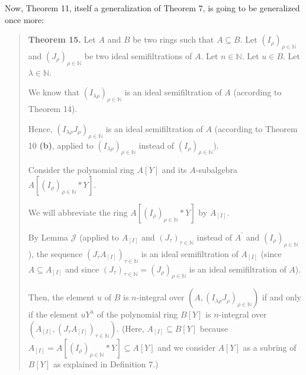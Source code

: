 \documentclass[12pt,final,notitlepage,onecolumn]{article}%
\begin{document}
Now, Theorem 11, itself a generalization of Theorem 7, is going to be
generalized once more:

\begin{quote}
\textbf{Theorem 15.} Let $A$ and $B$ be two rings such that $A\subseteq B$.
Let $\left(  I_{\rho}\right)  _{\rho\in\mathbb{N}}$ and $\left(  J_{\rho
}\right)  _{\rho\in\mathbb{N}}$ be two ideal semifiltrations of $A$. Let
$n\in\mathbb{N}$. Let $u\in B$. Let $\lambda\in\mathbb{N}$.

We know that $\left(  I_{\lambda\rho}\right)  _{\rho\in\mathbb{N}}$ is an
ideal semifiltration of $A$ (according to Theorem 14).

Hence, $\left(  I_{\lambda\rho}J_{\rho}\right)  _{\rho\in\mathbb{N}}$ is an
ideal semifiltration of $A$ (according to Theorem 10 \textbf{(b)}, applied to
$\left(  I_{\lambda\rho}\right)  _{\rho\in\mathbb{N}}$ instead of $\left(
I_{\rho}\right)  _{\rho\in\mathbb{N}}$).

Consider the polynomial ring $A\left[  Y\right]  $ and its $A$-subalgebra
$A\left[  \left(  I_{\rho}\right)  _{\rho\in\mathbb{N}}\ast Y\right]  $.

We will abbreviate the ring $A\left[  \left(  I_{\rho}\right)  _{\rho
\in\mathbb{N}}\ast Y\right]  $ by $A_{\left[  I\right]  }$.

By Lemma $\mathcal{J}$ (applied to $A_{\left[  I\right]  }$ and $\left(
J_{\tau}\right)  _{\tau\in\mathbb{N}}$ instead of $A^{\prime}$ and $\left(
I_{\rho}\right)  _{\rho\in\mathbb{N}}$), the sequence $\left(  J_{\tau
}A_{\left[  I\right]  }\right)  _{\tau\in\mathbb{N}}$ is an ideal
semifiltration of $A_{\left[  I\right]  }$ (since $A\subseteq A_{\left[
I\right]  }$ and since $\left(  J_{\tau}\right)  _{\tau\in\mathbb{N}}=\left(
J_{\rho}\right)  _{\rho\in\mathbb{N}}$ is an ideal semifiltration of $A$).

Then, the element $u$ of $B$ is $n$-integral over $\left(  A,\left(
I_{\lambda\rho}J_{\rho}\right)  _{\rho\in\mathbb{N}}\right)  $ if and only if
the element $uY^{\lambda}$ of the polynomial ring $B\left[  Y\right]  $ is
$n$-integral over $\left(  A_{\left[  I\right]  },\left(  J_{\tau}A_{\left[
I\right]  }\right)  _{\tau\in\mathbb{N}}\right)  .$ (Here, $A_{\left[
I\right]  }\subseteq B\left[  Y\right]  $ because $A_{\left[  I\right]
}=A\left[  \left(  I_{\rho}\right)  _{\rho\in\mathbb{N}}\ast Y\right]
\subseteq A\left[  Y\right]  $ and we consider $A\left[  Y\right]  $ as a
subring of $B\left[  Y\right]  $ as explained in Definition 7.)
\end{quote}
\end{document}
